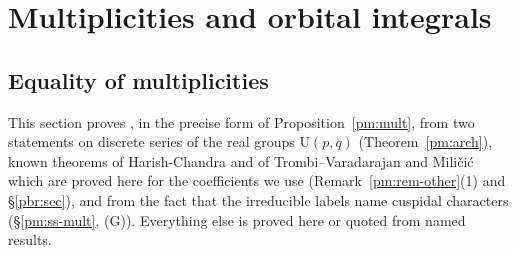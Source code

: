 \documentclass[10pt]{amsart}
\theoremstyle{definition}
\theoremstyle{remark}
\providecommand{\auAz}{\mathcal A_0}
\providecommand{\auF}{\mathbb F}
\providecommand{\auG}{\overline G}
\providecommand{\auGL}{\mathrm{GL}}
\providecommand{\auPl}{\Phi}
\providecommand{\auT}{\mathcal T}
\providecommand{\auU}{\mathrm U}
\providecommand{\aubar}[1]{\overline{#1}}
\providecommand{\audT}{d_{\auT}}
\begin{document}
\section{Multiplicities and orbital integrals}\label{B1:g3}
\providecommand{\auO}{\mathcal O}
\providecommand{\auPl}{\Phi}
\providecommand{\auT}{\mathcal T}
\providecommand{\auAz}{\mathcal A_0}
\providecommand{\auG}{\overline G}
\providecommand{\audT}{d_{\auT}}
\providecommand{\auU}{\mathrm U}
\providecommand{\auGL}{\mathrm{GL}}
\providecommand{\auA}{\mathbb A}
\providecommand{\auF}{\mathbb F}
\providecommand{\aubar}[1]{\overline{#1}}
\providecommand{\auf}[1]{\texttt{#1}}
\providecommand{\pmA}{\mathcal A}
\providecommand{\pmtr}{\operatorname{tr}}
\providecommand{\pmvol}{\operatorname{vol}}
\providecommand{\pmsupp}{\operatorname{supp}}
\providecommand{\pmN}{\operatorname{N}}
\providecommand{\pmTr}{\operatorname{Tr}}
\providecommand{\pmAd}{\operatorname{Ad}}
\providecommand{\pmch}{\operatorname{ch}}
\providecommand{\pmS}{\mathfrak S}
\providecommand{\pmn}{\mathfrak n}
\providecommand{\pmg}{\mathfrak g}
\providecommand{\pmGa}{\Gamma}
\providecommand{\pmell}{\mathrm{ell}}
\providecommand{\pmQ}{[G]}
\providecommand{\pmP}{\mathsf P}
\providecommand{\pmE}{\mathfrak E}

\subsection{Equality of multiplicities}\label{pm:sec}

This section proves {\cite[Proposition~14.36]{P46}}, in the precise form of
Proposition~\ref{pm:mult}, from two statements on discrete series of the real groups
$\auU(p,q)$ (Theorem~\ref{pm:arch}), known theorems of Harish-Chandra and of
Trombi--Varadarajan and Mili\v{c}i\'c which are proved here for the coefficients we use
(Remark~\ref{pm:rem-other}(1) and \S\ref{pbr:sec}), and from the fact that the irreducible labels
name cuspidal characters (\S\ref{pm:ss-mult}, (G)). Everything else is proved here or quoted from
named results.
\end{document}

